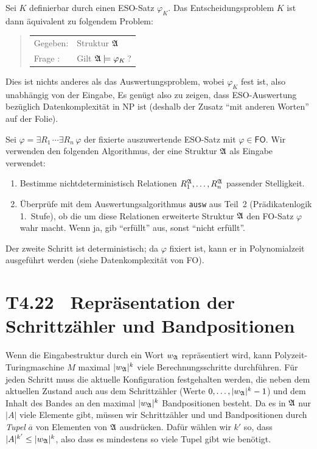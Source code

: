 \documentclass[fontsize=11pt, twoside=false, numbers=autoenddot]{scrbook}
\begin{document}
\begin{beweis}
  Sei $K$ definierbar durch einen ESO-Satz $\varphi_K$.
  Das Entscheidungsproblem $K$ ist dann äquivalent zu folgendem Problem:
  \begin{quote}
    \begin{tabular}{ll}
      Gegeben: & Struktur $\mathfrak{A}$ \\
      Frage  : & Gilt $\mathfrak{A} \models \varphi_K$\,?
    \end{tabular}
  \end{quote}
  Dies ist nichts anderes als das Auswertungsproblem, wobei $\varphi_K$
  fest ist, also unabhängig von der Eingabe,
  Es genügt also zu zeigen, dass ESO-Auswertung bezüglich Datenkomplexität in NP ist
  (deshalb der Zusatz "`mit anderen Worten"' auf der Folie).

  \par\smallskip
  Sei $\varphi = \exists R_1\,\cdots\exists R_n\,\varphi$
  der fixierte auszuwertende ESO-Satz mit $\varphi \in \textsf{FO}$.
  Wir verwenden den folgenden Algorithmus,
  der eine Struktur $\mathfrak{A}$ als Eingabe verwendet:
  \begin{enumerate}
    \item
      Bestimme nichtdeterministisch Relationen $R_1^\mathfrak{A},\dots,R_n^\mathfrak{A}$
      passender Stelligkeit.
    \item
      Überprüfe mit dem Auswertungsalgorithmus \texttt{ausw}
      aus Teil~2 (Prädikatenlogik 1.~Stufe),
      ob die um diese Relationen erweiterte Struktur $\mathfrak{A}$
      den FO-Satz $\varphi$ wahr macht.
      Wenn ja, gib "`erfüllt"' aus, sonst "`nicht erfüllt"'.
  \end{enumerate}
  Der zweite Schritt ist deterministisch;
  da $\varphi$ fixiert ist, kann er in Polynomialzeit ausgeführt werden
  (siehe Datenkomplexität von FO).
  \qedhere
\end{beweis}%

\section*{T4.22~ Repräsentation der Schrittzähler und Bandpositionen}

Wenn die Eingabestruktur \Amf durch ein Wort $w_\mathfrak{A}$ repräsentiert wird,
kann Polyzeit-Turingmaschine $M$ maximal $|w_\mathfrak{A}|^k$ viele Berechnungsschritte durchführen.
Für jeden Schritt muss die aktuelle Konfiguration festgehalten werden,
die neben dem aktuellen Zustand auch aus dem Schrittzähler (Werte $0,\dots,|w_\mathfrak{A}|^k-1$)
und dem Inhalt des Bandes an den maximal $|w_\mathfrak{A}|^k$ Bandpositionen besteht.
Da es in $\mathfrak{A}$ nur $|A|$ viele Elemente gibt,
müssen wir Schrittzähler und und Bandpositionen durch \emph{Tupel} $\overline{a}$ von Elementen
von $\mathfrak{A}$ ausdrücken. Dafür wählen wir $k'$ so, dass $|A|^{k'} \leq |w_\mathfrak{A}|^k$,
also dass es mindestens so viele Tupel gibt wie benötigt.
\end{document}
